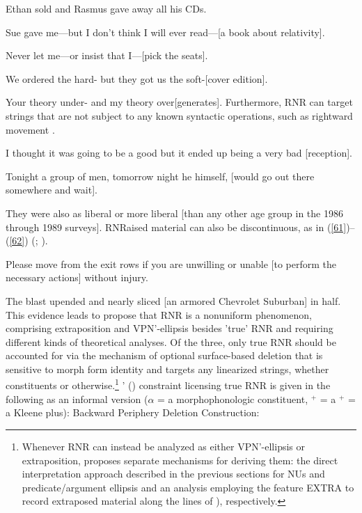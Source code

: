 \documentclass[output=paper
                ,modfonts
                ,nonflat
	        ,collection
	        ,collectionchapter
	        ,collectiontoclongg
 	        ,biblatex
                ,babelshorthands
                ,newtxmath
                ,draftmode
                ,colorlinks, citecolor=brown
]{./langsci/langscibook}
\begin{document}
\ea Ethan sold and Rasmus gave away all his CDs. \label{RNR8} \z

\ea Sue gave me---but I don't think I will ever read---[a book about relativity]. \label{54}\z

\ea Never let me---or insist that I---[pick the seats].\label{55}\z

\ea We ordered the hard- but they got us the soft-[cover edition].\label{56}\z

\ea Your theory under- and my theory over[generates].\label{57}\z
%
Furthermore, RNR can target strings that are not subject to any known syntactic operations, such as rightward movement \citep[865]{Chaves2014}.

\ea I thought it was going to be a good but it ended up being a very bad [reception].\label{58}\z

\ea Tonight a group of men, tomorrow night he himself, [would go out there somewhere and wait].\label{59}\z

\ea They were also as liberal or more liberal [than any other age group in the 1986 through 1989 surveys].\label{60}\z
RNRaised material can also be discontinuous, as in (\ref{61})--(\ref{62}) (\citealt[868]{Chaves2014}; \citealt[238--240]{Whitman2009}).

\ea Please move from the exit rows if you are unwilling or unable [to perform the necessary actions] without injury.\label{61}\z

\ea The blast upended and nearly sliced [an armored Chevrolet Suburban] in half.\label{62}\z
%
This evidence leads \citet{Chaves2014} to propose that RNR is a nonuniform phenomenon, comprising extraposition and VP\/N'-ellipsis besides 'true' RNR and requiring different kinds of theoretical analyses. Of the three, only true RNR should be accounted for via the mechanism of optional surface-based deletion that is sensitive to morph form identity and targets any linearized strings, whether constituents or otherwise.\footnote{Whenever RNR can instead be analyzed as either VP\/N'-ellipsis or extraposition, \citeauthor{Chaves2014} proposes separate mechanisms for deriving them: the direct interpretation approach described in the previous sections for NUs and predicate/argument ellipsis and an analysis employing the feature EXTRA to record extraposed material along the lines of \citeauthor{KimSag2005, Kay2012}), respectively.} \citeauthor{Chaves2014}' (\citeyear[874]{Chaves2014}) constraint licensing true RNR is given in the following as an informal version  ($\alpha$
= a morphophonologic constituent, $^{+}$ = a
 $^{+}$ = a Kleene plus): 
%
%
%
%
\ea
\label{63}
 Backward Periphery Deletion Construction:\\
 
\end{document}

